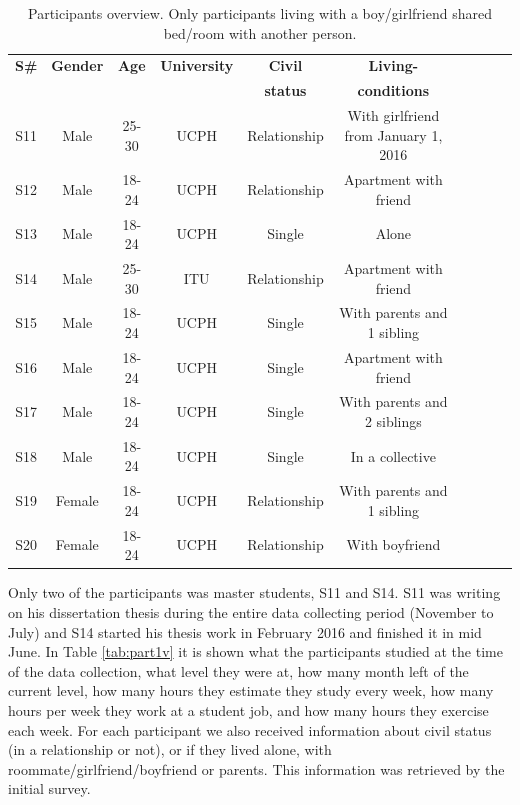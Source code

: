 \documentclass[12pt]{article} %
\begin{document}
\begin{table}[H]
\center
\begin{footnotesize}
	\begin{tabular}{| c | c | c | c | c | c | c | c | c | c |}
	\hline
	\textbf{S\#} & \textbf{Gender} & \textbf{Age} & \textbf{University} & \textbf{Civil} & \textbf{Living-}\\
	 & \textbf{} & \textbf{} & \textbf{} & \textbf{status} & \textbf{conditions} \\
	
	\hline
	S11 & Male & 25-30 & UCPH & Relationship & With girlfriend from January 1, 2016 \\
	\hline
	S12 & Male & 18-24 & UCPH & Relationship & Apartment with friend\\
	\hline
	S13 & Male & 18-24 & UCPH & Single & Alone \\
	\hline
	S14 & Male & 25-30 & ITU & Relationship & Apartment with friend \\
	\hline
	S15 & Male & 18-24 & UCPH & Single & With parents  and 1 sibling\\
	\hline
	S16 & Male & 18-24 & UCPH & Single & Apartment with friend\\
	\hline
	S17 & Male & 18-24 & UCPH & Single & With parents and 2 siblings \\
	\hline
	S18 & Male & 18-24 & UCPH & Single & In a collective\\
	\hline
	S19 & Female & 18-24 & UCPH & Relationship & With parents and 1 sibling\\
	\hline
	S20 & Female & 18-24 & UCPH & Relationship & With boyfriend\\
	\hline
	\end{tabular}
	\caption{Participants overview. Only participants living with a boy/girlfriend shared bed/room with another person.}
	\label{tab:partOv}
\end{footnotesize}
\end{table}

Only two of the participants was master students, S11 and S14. S11 was writing on his dissertation thesis during the entire data collecting period (November to July) and S14 started his thesis work in February 2016 and finished it in mid June. In Table \ref{tab:part1v} it is shown what the participants studied at the time of the data collection, what level they were at, how many month left of the current level, how many hours they estimate they study every week, how many hours per week they work at a student job, and how many hours they exercise each week. For each participant we also received information about civil status (in a relationship or not), or if they lived alone, with roommate/girlfriend/boyfriend or parents. This information was retrieved by the initial survey.   
\end{document}
